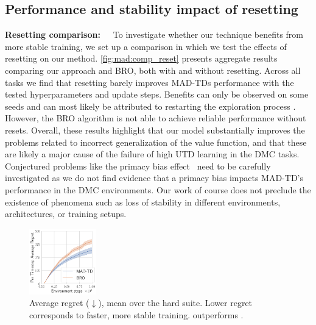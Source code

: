 \subsection{Performance and stability impact of resetting}


\textbf{Resetting comparison:}~~~To investigate whether our technique benefits from more stable training, we set up a comparison in which we test the effects of resetting on our method. \autoref{fig:mad:comp_reset} presents aggregate results comparing our approach and BRO, both with and without resetting. 
Across all tasks we find that resetting barely improves MAD-TDs performance with the tested hyperparameters and update steps.
Benefits can only be observed on some seeds and can most likely be attributed to restarting the exploration process \parencite{hussing2024dissecting}.
However, the BRO algorithm is not able to achieve reliable performance without resets.
Overall, these results highlight that our model substantially improves the problems related to incorrect generalization of the value function, and that these are likely a major cause of the failure of high UTD learning in the DMC tasks.
Conjectured problems like the primacy bias effect~\parencite{nikishin2022primacy} need to be carefully investigated as we do not find evidence that a primacy bias impacts MAD-TD's performance in the DMC environments. 
Our work of course does not preclude the existence of phenomena such as loss of stability in different environments, architectures, or training setups.
\begin{figure}
    \centering
    \includegraphics[width=0.26\textwidth]{figures/mad-td/average_regret_all_envs.pdf}
    \caption{Average regret ($\downarrow$), mean over the hard suite. Lower regret corresponds to faster, more stable training.  outperforms .}
    \label{fig:mad:regret}    
\end{figure}


